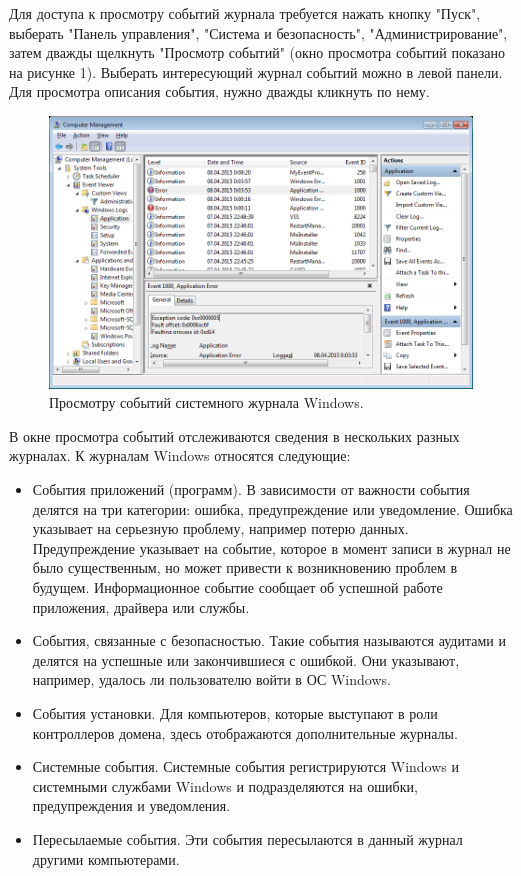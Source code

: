\documentclass[a4paper, 12pt]{report}		%
\begin{document}
Для доступа к просмотру событий журнала требуется нажать кнопку "Пуск", выберать "Панель управления", "Система и безопасность", "Администрирование", затем дважды щелкнуть "Просмотр событий" (окно просмотра событий показано на рисунке 1).‌ Выберать интересующий журнал событий можно в левой панели. Для просмотра описания события, нужно дважды кликнуть по нему.

\begin{figure}[h!]
\centering
\includegraphics[scale=0.75]{res/managment}
\caption{Просмотру событий системного журнала Windows.}
\end{figure}

В окне просмотра событий отслеживаются сведения в нескольких разных журналах. К журналам Windows относятся следующие:
\begin{itemize}
\item События приложений (программ). В зависимости от важности события делятся на три категории: ошибка, предупреждение или уведомление. Ошибка указывает на серьезную проблему, например потерю данных. Предупреждение указывает на событие, которое в момент записи в журнал не было существенным, но может привести к возникновению проблем в будущем. Информационное событие сообщает об успешной работе приложения, драйвера или службы.
\item События, связанные с безопасностью. Такие события называются аудитами и делятся на успешные или закончившиеся с ошибкой. Они указывают, например, удалось ли пользователю войти в ОС Windows.
\item События установки. Для компьютеров, которые выступают в роли контроллеров домена, здесь отображаются дополнительные журналы.
\item Системные события. Системные события регистрируются Windows и системными службами Windows и подразделяются на ошибки, предупреждения и уведомления.
\item Пересылаемые события. Эти события пересылаются в данный журнал другими компьютерами.
\end{itemize}
\end{document}
